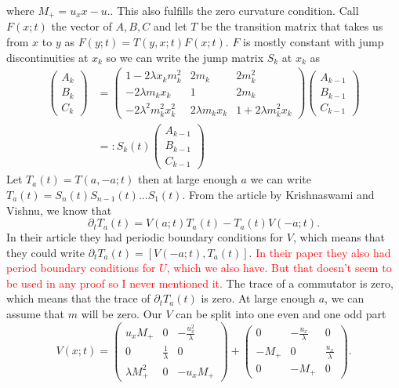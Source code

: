 \documentclass[english,master]{liumaiex}
\theoremstyle{plain}
\theoremstyle{definition}
\newcommand\todo[1]{\textcolor{red}{#1}}
\begin{document}
where $M_+ = u_x x - u.$. This also fulfills the zero curvature condition. Call $F(x;t)$ the vector of $A, B, C$ and let $T$ be the transition matrix that takes us from $x$ to $y$ as $F(y;t) = T(y,x;t)F(x;t)$. $F$ is mostly constant with jump discontinuities at $x_k$ so we can write the jump matrix $S_k$ at $x_k$ as
\begin{equation}
\begin{aligned}
\begin{pmatrix} A_k \\ B_k \\ C_k \end{pmatrix} &= 
\begin{pmatrix}
	1 - 2\lambda x_k m_k^2 & 2m_k & 2m_k^2 \\
	-2\lambda m_k x_k & 1 & 2m_k \\
	-2\lambda^2 m_k^2 x_k^2 & 2\lambda m_k x_k & 1 + 2\lambda m_k^2 x_k
\end{pmatrix}
\begin{pmatrix} A_{k-1} \\ B_{k-1} \\ C_{k-1} \end{pmatrix} \\
&=: S_k(t) 
\begin{pmatrix} A_{k-1} \\ B_{k-1} \\ C_{k-1} \end{pmatrix}
\end{aligned}
\end{equation}
Let $T_a(t) = T(a,-a;t)$ then at large enough $a$ we can write $T_a(t) = S_n(t)S_{n-1}(t)...S_1(t)$.
From the article by Krishnaswami and Vishnu\cite{Krishnaswami_2021}, we know that
\begin{equation}
	\partial_t T_a(t) = V(a;t)T_a(t) - T_a(t)V(-a;t).
\end{equation}
In their article they had periodic boundary conditions for $V$, which means that they could write $\partial_t T_a(t) = [V(-a;t), T_a(t)]$. \todo{In their paper they also had period boundary conditions for $U$, which we also have. But that doesn't seem to be used in any proof so I never mentioned it.} The trace of a commutator is zero, which means that the trace of $\partial_t T_a(t)$ is zero. At large enough $a$, we can assume that $m$ will be zero. Our $V$ can be split into one even and one odd part
\begin{equation}
	V(x;t) =
\begin{pmatrix}
	u_x M_+ & 0 & -\frac{u_x^2}{\lambda} \\
	0 & \frac{1}{\lambda} & 0 \\
	\lambda M_+^2 & 0 & -u_x M_+
\end{pmatrix} +
\begin{pmatrix}
	0  & -\frac{u_x}{\lambda} & 0 \\
	-M_+ & 0 & \frac{u_x}{\lambda} \\
	0 & -M_+ & 0
\end{pmatrix}.
\end{equation}
\end{document}
